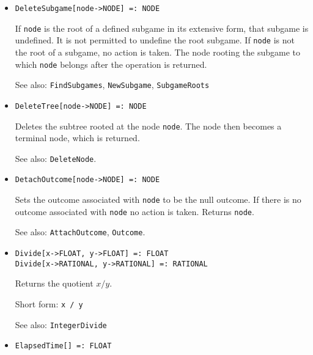 \begin{itemize}
\item
\protect \large \begin{verbatim}
DeleteSubgame[node->NODE] =: NODE
\end{verbatim}\normalsize

\bd
If \verb+node+ is the root of a defined subgame in its extensive form,
that subgame is undefined.  It is not permitted to undefine the root
subgame.  If \verb+node+ is not the root of a subgame, no action is
taken.  The node rooting the subgame to which \verb+node+ belongs after
the operation is returned.
\item
[See also:] {\tt FindSubgames}, {\tt NewSubgame}, {\tt SubgameRoots}
\ed

\item
\protect \large \begin{verbatim}
DeleteTree[node->NODE] =: NODE
\end{verbatim}\normalsize

\bd
Deletes the subtree rooted at the node \verb+node+.  The
node then becomes a terminal node, which is returned.
\item
[See also:] {\tt DeleteNode}.
\ed

\item
\protect \large \begin{verbatim}
DetachOutcome[node->NODE] =: NODE
\end{verbatim}\normalsize

\bd
Sets the outcome associated with \verb+node+ to be the
null outcome.  If there is no outcome associated with \verb+node+ no
action is taken.  Returns \verb+node+.
\item
[See also:] {\tt AttachOutcome}, {\tt Outcome}.
\ed

\item 
\protect \large \begin{verbatim}
Divide[x->FLOAT, y->FLOAT] =: FLOAT
Divide[x->RATIONAL, y->RATIONAL] =: RATIONAL
\end{verbatim} \normalsize

\bd
Returns the quotient $x / y$. 
\item
[Short form:] \verb+x / y+
\item
[See also:] {\tt IntegerDivide}
\ed


\item
\protect \large \begin{verbatim}
ElapsedTime[] =: FLOAT
\end{verbatim}\normalsize


\end{itemize}
